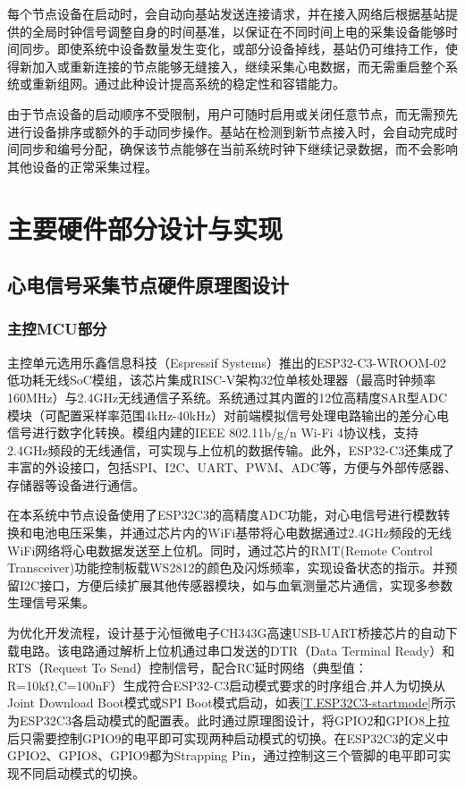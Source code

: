 每个节点设备在启动时，会自动向基站发送连接请求，并在接入网络后根据基站提供的全局时钟信号调整自身的时间基准，以保证在不同时间上电的采集设备能够时间同步。即使系统中设备数量发生变化，或部分设备掉线，基站仍可维持工作，使得新加入或重新连接的节点能够无缝接入，继续采集心电数据，而无需重启整个系统或重新组网。通过此种设计提高系统的稳定性和容错能力。

由于节点设备的启动顺序不受限制，用户可随时启用或关闭任意节点，而无需预先进行设备排序或额外的手动同步操作。基站在检测到新节点接入时，会自动完成时间同步和编号分配，确保该节点能够在当前系统时钟下继续记录数据，而不会影响其他设备的正常采集过程。

\newpage    %

\section{主要硬件部分设计与实现}

\subsection{心电信号采集节点硬件原理图设计}

\subsubsection{主控MCU部分}

主控单元选用乐鑫信息科技（Espressif Systems）推出的ESP32-C3-WROOM-02低功耗无线SoC模组，该芯片集成RISC-V架构32位单核处理器（最高时钟频率160MHz）与2.4GHz无线通信子系统。系统通过其内置的12位高精度SAR型ADC模块（可配置采样率范围4kHz-40kHz）对前端模拟信号处理电路输出的差分心电信号进行数字化转换。模组内建的IEEE 802.11b/g/n Wi-Fi 4协议栈，支持2.4GHz频段的无线通信，可实现与上位机的数据传输。此外，ESP32-C3还集成了丰富的外设接口，包括SPI、I2C、UART、PWM、ADC等，方便与外部传感器、存储器等设备进行通信。\cite{espressif2021esp32c3} \cite{基于STM32的心电监测系统设计}

在本系统中节点设备使用了ESP32C3的高精度ADC功能，对心电信号进行模数转换和电池电压采集，并通过芯片内的WiFi基带将心电数据通过2.4GHz频段的无线WiFi网络将心电数据发送至上位机。同时，通过芯片的RMT(Remote Control Transceiver)功能控制板载WS2812的颜色及闪烁频率，实现设备状态的指示。并预留I2C接口，方便后续扩展其他传感器模块，如与血氧测量芯片通信，实现多参数生理信号采集。\cite{基于蓝牙可穿戴式心电监测系统的设计}

为优化开发流程，设计基于沁恒微电子CH343G高速USB-UART桥接芯片的自动下载电路。该电路通过解析上位机通过串口发送的DTR（Data Terminal Ready）和RTS（Request To Send）控制信号，配合RC延时网络（典型值：R=10kΩ,C=100nF）生成符合ESP32-C3启动模式要求的时序组合,并人为切换从Joint Download Boot模式或SPI Boot模式启动，如表\ref{T.ESP32C3-startmode}所示为ESP32C3各启动模式的配置表。此时通过原理图设计，将GPIO2和GPIO8上拉后只需要控制GPIO9的电平即可实现两种启动模式的切换。在ESP32C3的定义中GPIO2、GPIO8、GPIO9都为Strapping Pin，通过控制这三个管脚的电平即可实现不同启动模式的切换。

